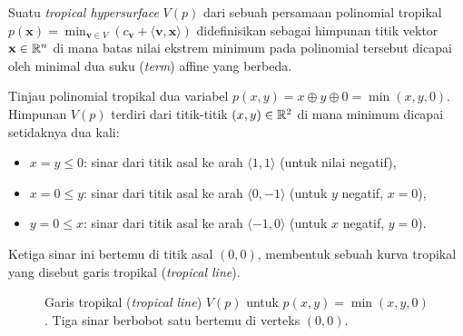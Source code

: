 \begin{definisi}
  Suatu \textit{tropical hypersurface} $V(p)$ dari sebuah persamaan polinomial tropikal $p(\mathbf{x}) = \min_{\mathbf{v} \in V} \left( c_{\mathbf{v}} + \langle \mathbf{v}, \mathbf{x} \rangle \right)$ didefinisikan sebagai himpunan titik vektor $\mathbf{x} \in \mathbb{R}^n$ di mana batas nilai ekstrem minimum pada polinomial tersebut dicapai oleh minimal dua suku (\textit{term}) affine yang berbeda. 
\end{definisi}

\begin{contoh}
  Tinjau polinomial tropikal dua variabel $p(x,y) = x \oplus y \oplus 0 = \min(x, y, 0)$. Himpunan $V(p)$ terdiri dari titik-titik $(x,y) \in \mathbb{R}^2$ di mana minimum dicapai setidaknya dua kali:
  \begin{itemize}
    \item $x = y \leq 0$: sinar dari titik asal ke arah $\langle 1, 1 \rangle$ (untuk nilai negatif),
    \item $x = 0 \leq y$: sinar dari titik asal ke arah $\langle 0, -1 \rangle$ (untuk $y$ negatif, $x = 0$),
    \item $y = 0 \leq x$: sinar dari titik asal ke arah $\langle -1, 0 \rangle$ (untuk $x$ negatif, $y = 0$).
  \end{itemize}
  Ketiga sinar ini bertemu di titik asal $(0,0)$, membentuk sebuah kurva tropikal yang disebut garis tropikal (\textit{tropical line}).
\end{contoh}

\begin{figure}[H]
  \centering
  \caption{Garis tropikal (\textit{tropical line}) $V(p)$ untuk $p(x,y) = \min(x, y, 0)$. Tiga sinar berbobot satu bertemu di verteks $(0,0)$.}
  \label{fig:tropical_line}
\end{figure}

